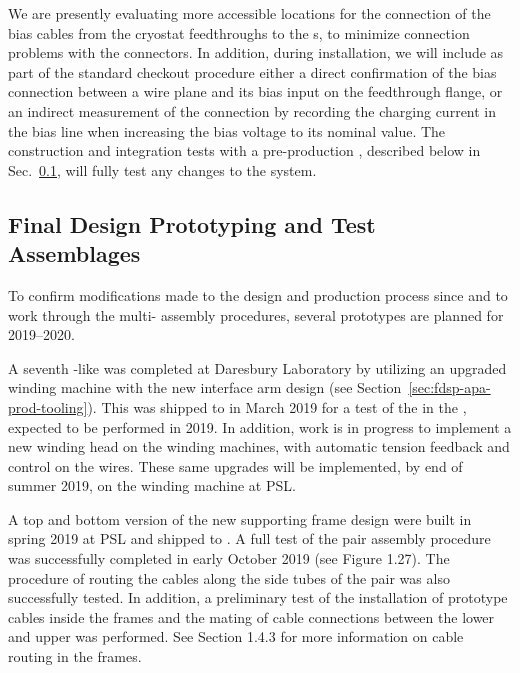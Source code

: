 We are presently evaluating more accessible locations for the connection of the bias  cables from the cryostat feedthroughs to the s, to minimize connection problems with the  connectors. In addition, during installation, we will include as part of the standard checkout procedure either a direct confirmation of the bias connection between a wire plane and its bias input on the feedthrough flange, or an indirect measurement of the connection by recording the charging current in the bias line when increasing the bias voltage to its nominal value.  The construction and integration tests with a pre-production , described below in Sec.~\ref{sec:fdsp-apa-qa-prototyping}, will fully test any changes to the  system. 


\subsection{Final Design Prototyping and Test Assemblages}
\label{sec:fdsp-apa-qa-prototyping}


To confirm modifications made to the  design and production process since  and to work through the multi- assembly procedures, several prototypes are planned for 2019--2020.

A seventh -like  was completed at Daresbury Laboratory by utilizing an upgraded winding machine with the new interface arm design (see Section~\ref{sec:fdsp-apa-prod-tooling}). This  was shipped to  in March 2019 for a test of the  in the \coldbox, expected to be performed in 2019. In addition, work is in progress to implement a new winding head on the  winding machines, with automatic tension feedback and control on the wires. These same upgrades will be implemented, by end of summer 2019, on the winding machine at PSL. 

A top and bottom version of the new supporting  frame design were built in spring 2019 at PSL and shipped to .  A full test of the  pair assembly procedure was successfully completed in early October 2019 (see Figure 1.27). The procedure of routing the  cables along the side tubes of the  pair was also successfully tested. In addition, a preliminary test of the installation of  prototype cables inside the  frames and the mating of cable connections between the lower and upper  was performed.  See Section 1.4.3 for more information on cable routing in the  frames. 


